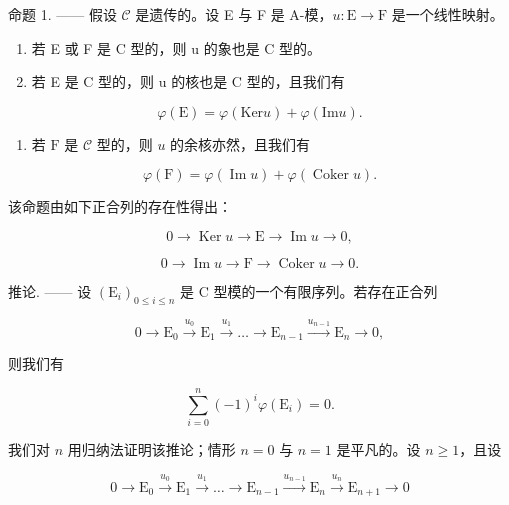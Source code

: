 命题 1. —— 假设 \(\mathcal{C}\) 是遗传的。设 E 与 F 是 A-模，\(u: \mathrm{E} \to \mathrm{F}\) 是一个线性映射。

\begin{enumerate}
\def\labelenumi{\alph{enumi})}
\item
  若 E 或 F 是 C 型的，则 u 的象也是 C 型的。
\item
  若 E 是 C 型的，则 u 的核也是 C 型的，且我们有
\end{enumerate}

\[
\varphi (\mathrm{E}) = \varphi (\mathrm{Ker} u) + \varphi (\mathrm{Im} u).\tag{2}
\]

\begin{enumerate}
\def\labelenumi{\alph{enumi})}
\setcounter{enumi}{2}
\tightlist
\item
  若 \(\mathrm{F}\) 是 \(\mathcal{C}\) 型的，则 \(u\) 的余核亦然，且我们有
\end{enumerate}

\[
\varphi (\mathrm{F}) = \varphi (\operatorname{Im} u) + \varphi (\operatorname{Coker} u).\tag{3}
\]

该命题由如下正合列的存在性得出：

\[
0 \longrightarrow \operatorname{Ker} u \longrightarrow \mathrm{E} \longrightarrow \operatorname{Im} u \longrightarrow 0,
\]

\[
0 \longrightarrow \operatorname{Im} u \longrightarrow \mathrm{F} \longrightarrow \operatorname{Coker} u \longrightarrow 0.
\]

推论. —— 设 \((\mathrm{E}_{i})_{0\leqslant i\leqslant n}\) 是 C 型模的一个有限序列。若存在正合列

\[
0 \longrightarrow \mathrm{E} _ {0} \stackrel {u _ {0}} {\longrightarrow} \mathrm{E} _ {1} \stackrel {u _ {1}} {\longrightarrow} \dots \longrightarrow \mathrm{E} _ {n - 1} \stackrel {u _ {n - 1}} {\longrightarrow} \mathrm{E} _ {n} \longrightarrow 0,
\]

则我们有

\[
\sum_ {i = 0} ^ {n} (- 1) ^ {i} \varphi (\mathrm{E} _ {i}) = 0.\tag{4}
\]

我们对 \(n\) 用归纳法证明该推论；情形 \(n = 0\) 与 \(n = 1\) 是平凡的。设 \(n \geqslant 1\)，且设

\[
0 \longrightarrow \mathrm{E} _ {0} \stackrel {u _ {0}} {\longrightarrow} \mathrm{E} _ {1} \stackrel {u _ {1}} {\longrightarrow} \dots \longrightarrow \mathrm{E} _ {n - 1} \stackrel {u _ {n - 1}} {\longrightarrow} \mathrm{E} _ {n} \stackrel {u _ {n}} {\longrightarrow} \mathrm{E} _ {n + 1} \longrightarrow 0
\]

